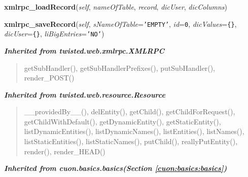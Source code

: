     \vspace{0.5ex}

\hspace{.8\funcindent}\begin{boxedminipage}{\funcwidth}

    \raggedright \textbf{xmlrpc\_loadRecord}(\textit{self}, \textit{nameOfTable}, \textit{record}, \textit{dicUser}, \textit{dicColumns})

\setlength{\parskip}{2ex}
\setlength{\parskip}{1ex}
    \end{boxedminipage}

    \label{cuon:SQL:SQL:xmlrpc_saveRecord}

    \vspace{0.5ex}

\hspace{.8\funcindent}\begin{boxedminipage}{\funcwidth}

    \raggedright \textbf{xmlrpc\_saveRecord}(\textit{self}, \textit{sNameOfTable}={\tt \texttt{'}\texttt{EMPTY}\texttt{'}}, \textit{id}={\tt 0}, \textit{dicValues}={\tt \texttt{\{}\texttt{\}}}, \textit{dicUser}={\tt \texttt{\{}\texttt{\}}}, \textit{liBigEntries}={\tt \texttt{'}\texttt{NO}\texttt{'}})

\setlength{\parskip}{2ex}
\setlength{\parskip}{1ex}
    \end{boxedminipage}


\large{\textbf{\textit{Inherited from twisted.web.xmlrpc.XMLRPC}}}

\begin{quote}
getSubHandler(), getSubHandlerPrefixes(), putSubHandler(), render\_POST()
\end{quote}

\large{\textbf{\textit{Inherited from twisted.web.resource.Resource}}}

\begin{quote}
\_\_providedBy\_\_(), delEntity(), getChild(), getChildForRequest(), getChildWithDefault(), getDynamicEntity(), getStaticEntity(), listDynamicEntities(), listDynamicNames(), listEntities(), listNames(), listStaticEntities(), listStaticNames(), putChild(), reallyPutEntity(), render(), render\_HEAD()
\end{quote}

\large{\textbf{\textit{Inherited from cuon.basics.basics\textit{(Section \ref{cuon:basics:basics})}}}}

